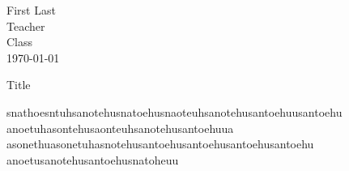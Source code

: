 \documentclass[12pt]{article}
\begin{document}
\raggedright

	First Last \\ Teacher \\ Class \\ \today

	\centerline{Title}
    
\setlength{\parindent}{.5in}
snathoesntuhsanotehusnatoehusnaoteuhsanotehusantoehuusantoehu
anoetuhasontehusaonteuhsanotehusantoehuua
asonethuasonetuhasnotehusantoehusantoehusantoehusantoehu
anoetusanotehusantoehusnatoheuu \parencite[, 16]{bill}



\printbibliography
\end{document}
